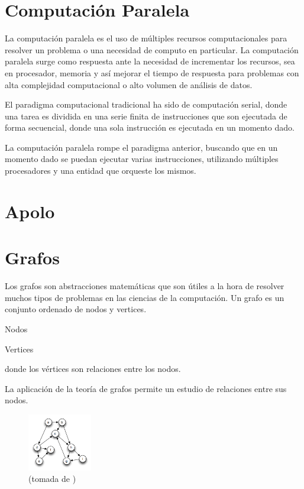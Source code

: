 
	\section{Computación Paralela}

	La computación paralela es el uso de múltiples recursos computacionales para resolver un problema o una necesidad de computo en particular. La computación paralela surge como respuesta ante la necesidad de incrementar los recursos, sea en procesador, memoria y así mejorar el tiempo de respuesta para problemas con alta complejidad computacional o alto volumen de análisis de datos. 

	El paradigma computacional tradicional ha sido de computación serial, donde una tarea es dividida en una serie finita de instrucciones que son ejecutada de forma secuencial, donde una sola instrucción es ejecutada en un momento dado. 

	La computación paralela rompe el paradigma anterior, buscando que en un momento dado se puedan ejecutar varias instrucciones, utilizando múltiples procesadores y una entidad que orqueste los mismos.\cite{LLNL} \cite{SC}

	\section{Apolo}


	\section{Grafos}

	Los grafos son abstracciones matemáticas que son útiles a la hora de resolver muchos tipos de problemas en las ciencias de la computación. Un grafo es un conjunto ordenado de nodos y vertices. 

	Nodos

	Vertices

	donde los vértices son relaciones entre los nodos. 

	La aplicación de la teoría de grafos permite un estudio de relaciones entre sus nodos. 



	\begin{figure}[H]
		\centering
		\includegraphics[width=0.25\textwidth]{aux/grafo}
		\caption[Estructura de un Grafo]{
		(tomada de \cite{BoostGrafos})}
	\end{figure}


